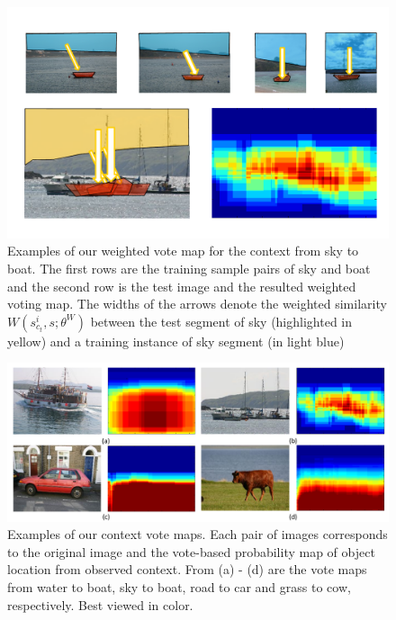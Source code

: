
\begin{figure}[ht!]
\begin{center}
\includegraphics[width=0.6\linewidth]{figures/vote_sky_boat.pdf}
\end{center}
\caption{Examples of our weighted vote map for the context from sky to boat. The first rows are the training sample pairs of sky and boat and the second row is the test image and the resulted weighted voting map. The widths of the arrows denote the weighted similarity $W(s_{c_t}^i,s;\theta^W)$ between the test segment of sky (highlighted in yellow) and a training instance of sky segment (in light blue)}
\label{fig:vote_sky_boat}
\end{figure}


\begin{figure}[ht!]
\begin{center}
\includegraphics[width=0.6\linewidth]{figures/votemap.pdf}
\end{center}
\caption{Examples of our context vote maps. Each pair of images corresponds to the original image and the vote-based probability map of object location from observed context. From (a) - (d) are the vote maps from water to boat, sky to boat, road to car and grass to cow, respectively. Best viewed in color.}
\label{fig:votemap}
\end{figure}


